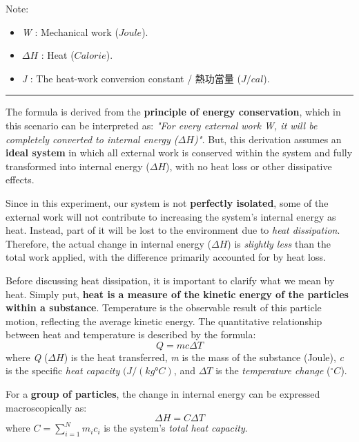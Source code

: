 \documentclass[12pt]{article}
\begin{document}
{\small 
Note:

\begin{itemize}
    \item \textit{W}  : Mechanical work ($Joule$).
    \item $\Delta H$   : Heat ($Calorie$).
    \item \textit{J}   : The heat-work conversion constant / 熱功當量 ($J/cal$).
\end{itemize}

}

\vspace*{0.3cm}
\hrule
\vspace*{0.3cm}

The formula is derived from the\textbf{ principle of energy conservation}, which in this scenario can be interpreted as: \textit{"For every external work W, it will be completely converted to internal energy ($\Delta H$)".}  But, this derivation assumes an\textbf{ ideal system} in which all external work is conserved within the system and fully transformed into internal energy ($\Delta H$), with no heat loss or other dissipative effects. 

\vspace*{0.3cm}
Since in this experiment, our system is not \textbf{perfectly isolated}, some of the external work will not contribute to increasing the system's internal energy as heat. Instead, part of it will be lost to the environment due to \textit{heat dissipation}. Therefore, the actual change in internal energy ($\Delta H$) is \textit{slightly less }than the total work applied, with the difference primarily accounted for by heat loss.

\vspace*{0.3cm}
Before discussing heat dissipation, it is important to clarify what we mean by heat. Simply put, \textbf{heat is a measure of the kinetic energy of the particles within a substance}. Temperature is the observable result of this particle motion, reflecting the average kinetic energy. The quantitative relationship between heat and temperature is described by the formula:
\[Q=mc\Delta T\]
\noindent
{\small
where \textit{Q} ($\Delta H$)  is the heat transferred, \textit{m} is the mass of the substance (Joule), \textit{c} is the specific \textit{heat capacity} $(J/(kg°C)$, and $\Delta T $ is the \textit{temperature change }($^\circ C$).
}
\vspace*{0.3cm}

    For a \textbf{group of particles}, the change in internal energy can be expressed macroscopically as:
\[
\Delta H = C \Delta T
\]
\noindent
where $C = \sum_{i=1}^{N} m_i c_i$ is the system's \textit{total heat capacity}.
\end{document}
